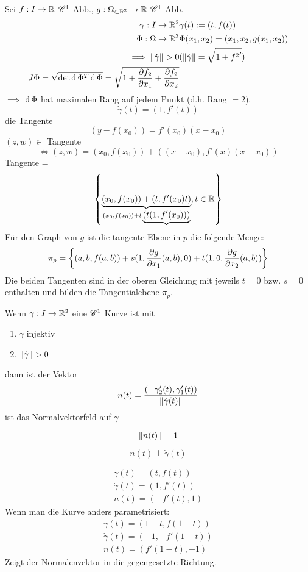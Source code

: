 \begin{Bem}
  Sei $f:I\rightarrow\mathbb{R}$ $\mathscr{C}^1$ Abb., $g:\Omega_{\subset\mathbb{R}^2}\rightarrow\mathbb{R}$ $\mathscr{C}^1$ Abb. 
  \begin{align*}
    \gamma:I\to\mb{R}^2 & \gamma(t):=(t,f(t))\\
    \Phi:\Omega\to\mb{R}^3 & \Phi(x_1,x_2)=(x_1,x_2, g(x_1,x_2))\\
    \implies \Norm{\dot\gamma}>0 & (\Norm{\dot\gamma}=\sqrt{1+{f^2}'})\\
    J\Phi=\sqrt{\det \md \Phi^T\md \Phi}=\sqrt{1+\Part{f_2}{x_1}+\Part{f_2}{x_2}}
  \end{align*}
  $\implies$ $\operatorname{d}\Phi$ hat maximalen Rang auf jedem Punkt (d.h. Rang $=2$).
  \[\dot\gamma(t)=(1,f'(t))\]
  die Tangente
  \[(y-f(x_0))=f'(x_0)(x-x_0)\]
  $(z,w)\in$ Tangente
  \[\iff (z,w)=(x_0,f(x_0))+\left( (x-x_0),f'(x)(x-x_0) \right)\]
  Tangente = 
  \[\left\{ \underbrace{(x_0,f(x_0))+(t,f'(x_0)t)}_{(x_0,f(x_0))+t\underbrace{(t(1,f'(x_0)))}}, t\in\mathbb{R}\right\}\]
  Für den Graph von $g$ ist die tangente Ebene in $p$ die folgende Menge:
  \[\pi_p=\left\{ (a,b,f(a,b))+s(1,\dfrac{\partial g}{\partial x_1}(a,b), 0)+t(1,0, \dfrac{\partial g}{\partial x_2}(a,b)) \right\}\]
  Die beiden Tangenten sind in der oberen Gleichung mit jeweils $t=0$ bzw. $s=0$ enthalten und bilden die Tangentialebene $\pi_p$.
\end{Bem}
\begin{Def}
  Wenn $\gamma:I\rightarrow\mathbb{R}^2$ eine $\mathscr{C}^1$ Kurve ist mit
  \begin{enumerate}
    \item $\gamma$ injektiv
    \item $\Norm{\dot\gamma}>0$
  \end{enumerate}
  dann ist der Vektor 
  \[n(t)=\frac{(-\gamma_2'(t),\gamma_1'(t))}{\left\| \dot\gamma(t) \right\|}\]
  ist das Normalvektorfeld auf $\gamma$
\end{Def}
\begin{Bem}
  \[\left\| n(t) \right\|=1\]
\end{Bem}
\begin{Bem}
  \[n(t)\perp\dot\gamma(t)\]
\end{Bem}
\begin{Bsp}
  \begin{eqnarray*}
    \gamma(t)=(t,f(t))\\
    \dot\gamma(t)=(1,f'(t))\\
    n(t)=(-f'(t), 1)
  \end{eqnarray*}
  Wenn man die Kurve anders parametrisiert:
  \begin{eqnarray*}
    \gamma(t)=(1-t,f(1-t))\\
    \dot\gamma(t)=(-1,-f'(1-t))\\
    n(t)=(f'(1-t), -1)
  \end{eqnarray*}
  Zeigt der Normalenvektor in die gegengesetzte Richtung.
\end{Bsp}
